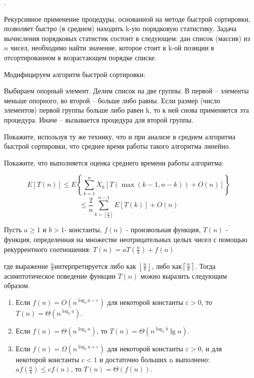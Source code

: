 \begin{problem}.

Рекурсивное применение процедуры, основанной на методе быстрой сортировки, позволяет быстро (в среднем) находить k-ую порядковую статистику. Задача вычисления порядковых статистик состоит в следующем: дан список (массив) из $n$ чисел, необходимо найти значение, которое стоит в k-ой позиции в отсортированном в возрастающем порядке списке. 

\noindent Модифицируем алгоритм быстрой сортировки:


 Выбираем опорный элемент. Делим список на две группы. В первой -- элементы меньше опорного, во второй -- больше либо равны.
 Если размер (число элементов) первой группы больше либо равен k, то к ней снова применяется эта процедура. Иначе -- вызывается процедура для второй группы.
 
\noindent Покажите, используя ту же технику, что и при анализе в среднем алгоритма быстрой сортировки, что среднее время работы такого алгоритма линейно.

\begin{ordre}

\noindent Покажите, что выполняется оценка среднего времени работы алгоритма:

\[
E[T(n)]\le E\left\{\sum _{k=1}^{n}X_{k} \left[T\left(\max (k-1,n-k)\right)+O(n)\right] \right\} 
\]
\[ \le \frac{2}{n} \sum _{k=\left\lfloor \frac{n}{2} \right\rfloor }^{n-1}E[T(k)] +O(n)
\]



\end{ordre}
\end{problem}

\begin{remark}

Пусть $a\ge 1$ и $b>1$- константы, $f(n)$ - произвольная функция, $T(n)$ - функция, определенная на множестве неотрицательных целых чисел с помощью рекуррентного соотношения: $T(n)=aT\left(\frac{n}{b} \right)+f(n)$

\noindent где выражение $\frac{n}{b} $интерпретируется либо как $\left\lfloor \frac{n}{b} \right\rfloor $, либо как$\left\lceil \frac{n}{b} \right\rceil $. Тогда асимптотическое поведение функции $T(n)$ можно выразить следующим образом. 

\begin{enumerate}
\item  Если $f(n)=O(n^{\log _{b} a-\varepsilon } )$ для некоторой константы $\varepsilon >0$, то $T(n)=\Theta \left(n^{\log _{b} a} \right)$.

\item  Если $f(n)=\Theta \left(n^{\log _{b} a} \right)$, то $T(n)=\Theta \left(n^{\log _{a} b} \lg n\right)$.

\item  Если $f(n)=\Omega (n^{\log _{b} a+\varepsilon } )$ для некоторой константы $\varepsilon >0$, и для некоторой константы $c<1$ и достаточно больших n выполнено: $af\left(\frac{n}{b} \right)\le cf(n)$, то $T(n)=\Theta \left(f(n)\right)$.
\end{enumerate}

\end{remark}




